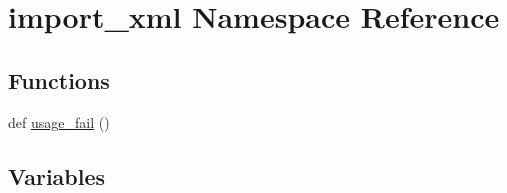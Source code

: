 \hypertarget{namespaceimport__xml}{}\section{import\+\_\+xml Namespace Reference}
\label{namespaceimport__xml}
\subsection*{Functions}
\begin{DoxyCompactItemize}
\item 
def \hyperlink{namespaceimport__xml_a6b99a6d995ebfb9fbaea25e2270004a0}{usage\+\_\+fail} ()
\end{DoxyCompactItemize}
\subsection*{Variables}
